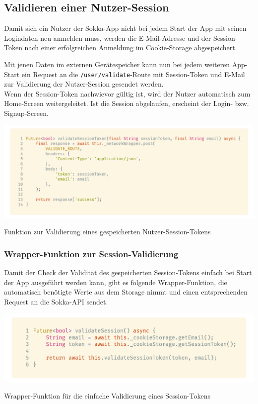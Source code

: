 \subsection{Validieren einer Nutzer-Session}

Damit sich ein Nutzer der Sokka-App nicht bei jedem Start der App mit seinen Logindaten neu
anmelden muss, werden die E-Mail-Adresse und der Session-Token nach einer erfolgreichen Anmeldung
im Cookie-Storage abgespeichert.

Mit jenen Daten im externen Gerätespeicher kann nun bei jedem weiteren App-Start ein Request an die
\lstinline{/user/validate}-Route mit Session-Token und E-Mail zur Validierung der Nutzer-Session
gesendet werden.\\
Wenn der Session-Token nachwievor gültig ist, wird der Nutzer automatisch zum Home-Screen weitergeleitet.
Ist die Session abgelaufen, erscheint der Login- bzw. Signup-Screen.

\begin{code}
    \centering
    \includegraphics[width=1\textwidth]{images/Client/services/user-auth/validate.png}
    \vspace{-25pt}
    \caption{Funktion zur Validierung eines gespeicherten Nutzer-Session-Tokens}
\end{code}

\subsubsection{Wrapper-Funktion zur Session-Validierung}

Damit der Check der Validität des gespeicherten Session-Tokens einfach
bei Start der App ausgeführt werden kann, gibt es folgende Wrapper-Funktion,
die automatisch benötigte Werte aus dem Storage nimmt und einen entsprechenden
Request an die Sokka-API sendet.

\begin{code}
    \centering
    \includegraphics[width=1\textwidth]{images/Client/services/user-auth/validateSession.png}
    \vspace{-25pt}
    \caption{Wrapper-Funktion für die einfache Validierung eines Session-Tokens}
\end{code}